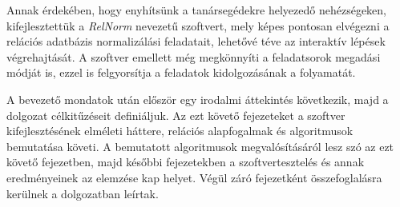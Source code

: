 Annak érdekében, hogy enyhítsünk a tanársegédekre helyezedő nehézségeken, kifejlesztettük a \textit{RelNorm} nevezetű szoftvert, mely képes pontosan elvégezni a relációs adatbázis normalizálási feladatait, lehetővé téve az interaktív lépések végrehajtását. A szoftver emellett még megkönnyíti a feladatsorok megadási módját is, ezzel is felgyorsítja a feladatok kidolgozásának a folyamatát.

A bevezető mondatok után először egy irodalmi áttekintés következik, majd a dolgozat célkitűzéseit definiáljuk. Az ezt követő fejezeteket a szoftver kifejlesztésének elméleti háttere, relációs alapfogalmak és algoritmusok bemutatása követi. A bemutatott algoritmusok megvalósításáról lesz szó az ezt követő fejezetben, majd későbbi fejezetekben a szoftvertesztelés és annak eredményeinek az elemzése kap helyet. Végül záró fejezetként összefoglalásra kerülnek a dolgozatban leírtak.

